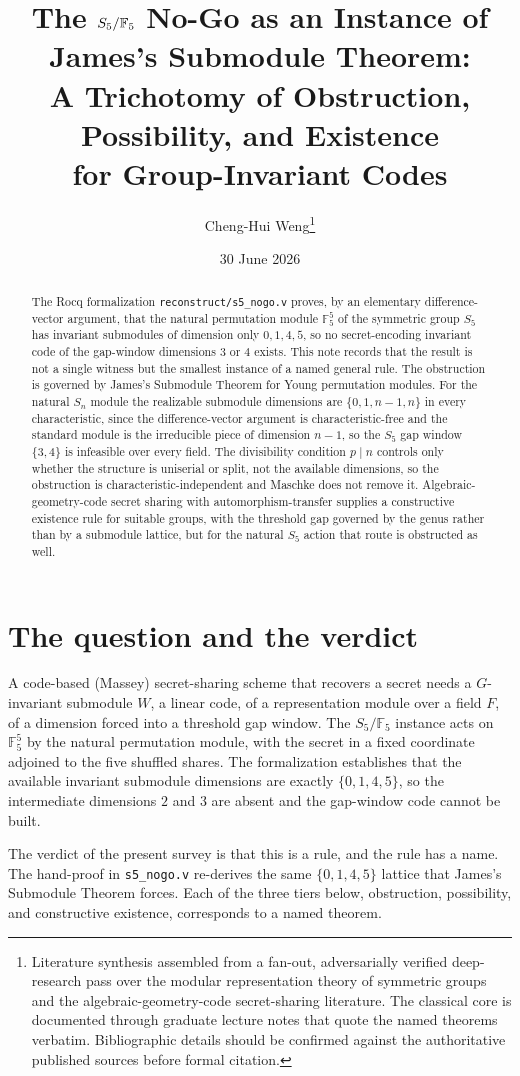 \documentclass[11pt]{article}
\title{The $\Sym_5/\GF{5}$ No-Go as an Instance of James's Submodule Theorem:\\
A Trichotomy of Obstruction, Possibility, and Existence\\ for Group-Invariant Codes}
\author{Cheng-Hui Weng\thanks{Literature synthesis assembled from a fan-out, adversarially
verified deep-research pass over the modular representation theory of symmetric groups and
the algebraic-geometry-code secret-sharing literature. The classical core is documented
through graduate lecture notes that quote the named theorems verbatim. Bibliographic
details should be confirmed against the authoritative published sources before formal
citation.}}
\date{30 June 2026}
\newcommand{\GF}[1]{\mathbb{F}_{#1}}
\newcommand{\Sym}{S}
\begin{document}
\maketitle

\begin{abstract}
The Rocq formalization \texttt{reconstruct/s5\_nogo.v} proves, by an elementary
difference-vector argument, that the natural permutation module $\GF{5}^5$ of the
symmetric group $\Sym_5$ has invariant submodules of dimension only $0,1,4,5$, so no
secret-encoding invariant code of the gap-window dimensions $3$ or $4$ exists. This note
records that the result is not a single witness but the smallest instance of a named
general rule. The obstruction is governed by James's Submodule Theorem for Young
permutation modules. For the natural $\Sym_n$ module the realizable submodule dimensions
are $\{0,1,n-1,n\}$ in every characteristic, since the difference-vector argument is
characteristic-free and the standard module is the irreducible piece of dimension $n-1$, so
the $\Sym_5$ gap window $\{3,4\}$ is infeasible over every field. The divisibility condition
$p \mid n$ controls only whether the structure is uniserial or split, not the available
dimensions, so the obstruction is characteristic-independent and Maschke does not remove
it. Algebraic-geometry-code secret sharing with automorphism-transfer supplies a
constructive existence rule for suitable groups, with the threshold gap governed by the
genus rather than by a submodule lattice, but for the natural $\Sym_5$ action that route is
obstructed as well.
\end{abstract}

\section{The question and the verdict}

A code-based (Massey) secret-sharing scheme that recovers a secret needs a $G$-invariant
submodule $W$, a linear code, of a representation module over a field $F$, of a dimension
forced into a threshold gap window. The $\Sym_5/\GF{5}$ instance acts on $\GF{5}^5$ by the
natural permutation module, with the secret in a fixed coordinate adjoined to the five
shuffled shares. The formalization establishes that the available invariant submodule
dimensions are exactly $\{0,1,4,5\}$, so the intermediate dimensions $2$ and $3$ are
absent and the gap-window code cannot be built.

The verdict of the present survey is that this is a rule, and the rule has a name. The
hand-proof in \texttt{s5\_nogo.v} re-derives the same $\{0,1,4,5\}$ lattice that James's
Submodule Theorem forces. Each of the three tiers below, obstruction, possibility, and
constructive existence, corresponds to a named theorem.
\end{document}
